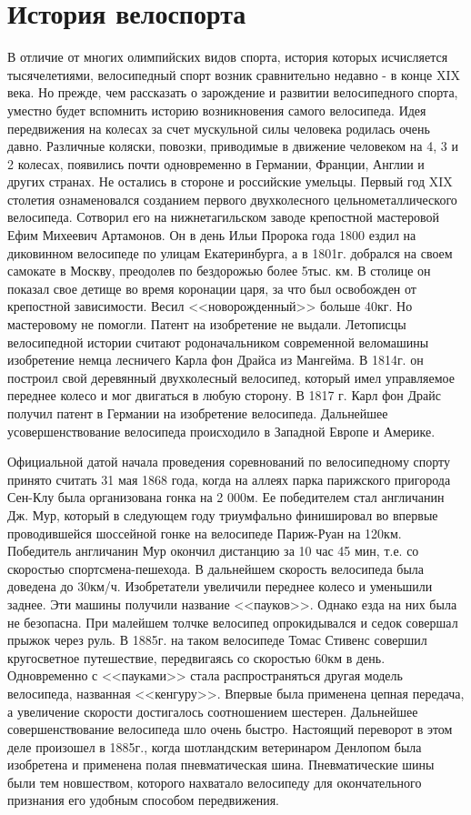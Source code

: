 \documentclass[a4paper,14pt]{extreport}
\begin{document}
\section{История велоспорта}
В отличие от многих олимпийских видов спорта, история которых исчисляется тысячелетиями, велосипедный спорт возник сравнительно недавно - в конце XIX века. Но прежде, чем рассказать о зарождение и развитии велосипедного спорта, уместно будет вспомнить историю возникновения самого велосипеда. Идея передвижения на колесах за счет мускульной силы человека родилась очень давно. Различные коляски, повозки, приводимые в движение человеком на 4, 3 и 2 колесах, появились почти одновременно в Германии, Франции, Англии и других странах. Не остались в стороне и российские умельцы. Первый год XIX столетия ознаменовался созданием первого двухколесного цельнометаллического велосипеда. Сотворил его на нижнетагильском заводе крепостной мастеровой Ефим Михеевич Артамонов. Он в день Ильи Пророка года 1800 ездил на диковинном велосипеде по улицам Екатеринбурга, а в 1801г. добрался на своем самокате в Москву, преодолев по бездорожью более 5тыс. км. В столице он показал свое детище во время коронации царя, за что был освобожден от крепостной зависимости. Весил <<новорожденный>> больше 40кг. Но мастеровому не помогли. Патент на изобретение не выдали. Летописцы велосипедной истории считают родоначальником современной веломашины изобретение немца лесничего Карла фон Драйса из Мангейма. В 1814г. он построил свой деревянный двухколесный велосипед, который имел управляемое переднее колесо и мог двигаться в любую сторону.
В 1817 г. Карл фон Драйс получил патент в Германии на изобретение велосипеда. Дальнейшее усовершенствование велосипеда происходило в Западной Европе и Америке.

Официальной датой начала проведения соревнований по велосипедному спорту принято считать 31 мая 1868 года, когда на аллеях парка парижского пригорода Сен-Клу была организована гонка на 2 000м. Ее победителем стал англичанин Дж. Мур, который в следующем году триумфально финишировал во впервые проводившейся шоссейной гонке на велосипеде Париж-Руан на 120км. Победитель англичанин Мур окончил дистанцию за 10 час 45 мин, т.е. со скоростью спортсмена-пешехода. В дальнейшем скорость велосипеда была доведена до 30км/ч. Изобретатели увеличили переднее колесо и уменьшили заднее. Эти машины получили название <<пауков>>. Однако езда на них была не безопасна. При малейшем толчке велосипед опрокидывался и седок совершал прыжок через руль. В 1885г. на таком велосипеде Томас Стивенс совершил кругосветное путешествие, передвигаясь со скоростью 60км в день. Одновременно с <<пауками>> стала распространяться другая модель велосипеда, названная <<кенгуру>>. Впервые была применена цепная передача, а увеличение скорости достигалось соотношением шестерен. Дальнейшее совершенствование велосипеда шло очень быстро. Настоящий переворот в этом деле произошел в 1885г., когда шотландским ветеринаром Денлопом была изобретена и применена полая пневматическая шина. Пневматические шины были тем новшеством, которого нахватало велосипеду для окончательного признания его удобным способом передвижения.
\end{document}
